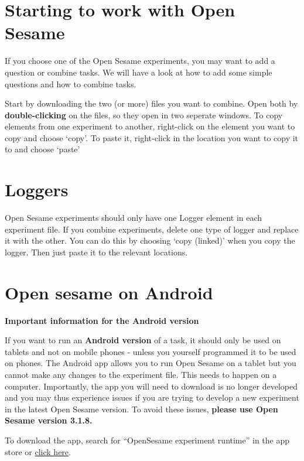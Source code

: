 \documentclass[
]{book}
\begin{document}
\hypertarget{starting-to-work-with-open-sesame}{%
\section{Starting to work with Open Sesame}\label{starting-to-work-with-open-sesame}}

If you choose one of the Open Sesame experiments, you may want to add a question or combine tasks. We will have a look at how to add some simple questions and how to combine tasks.

Start by downloading the two (or more) files you want to combine. Open both by \textbf{double-clicking} on the files, so they open in two seperate windows. To copy elements from one experiment to another, right-click on the element you want to copy and choose `copy'. To paste it, right-click in the location you want to copy it to and choose `paste'

\hypertarget{loggers}{%
\section{Loggers}\label{loggers}}

Open Sesame experiments should only have one Logger element in each experiment file. If you combine experiments, delete one type of logger and replace it with the other. You can do this by choosing `copy (linked)' when you copy the logger. Then just paste it to the relevant locations.

\hypertarget{open-sesame-on-android}{%
\section{Open sesame on Android}\label{open-sesame-on-android}}

\textbf{Important information for the Android version}

If you want to run an \textbf{Android version} of a task, it should only be used on tablets and not on mobile phones - unless you yourself programmed it to be used on phones. The Android app allows you to run Open Sesame on a tablet but you cannot make any changes to the experiment file. This needs to happen on a computer. Importantly, the app you will need to download is no longer developed and you may thus experience issues if you are trying to develop a new experiment in the latest Open Sesame version. To avoid these issues, \textbf{please use Open Sesame version 3.1.8.}

To download the app, search for ``OpenSesame experiment runtime'' in the app store or \href{https://play.google.com/store/apps/details?id=nl.cogsci.opensesame}{click here}.
\end{document}
